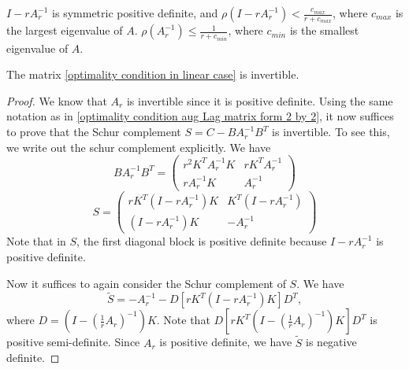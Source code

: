 \begin{itemize}
\begin{lemma}
$I - rA_r^{-1}$ is symmetric positive definite, and $\rho(I - rA_r^{-1}) < \frac{c_{max}}{r + c_{max}}$, where $c_{max}$ is the largest eigenvalue of $A$. $\rho(A_r^{-1}) \leq \frac{1}{r + c_{min}}$, where $c_{min}$ is the smallest eigenvalue of $A$.
\end{lemma}

\begin{theorem}
The matrix \eqref{optimality condition in linear case} is invertible. 
\end{theorem}
\begin{proof}
We know that $A_r$ is invertible since it is positive definite. 
Using the same notation as in \eqref{optimality condition aug Lag matrix form 2 by 2}, it now suffices to prove that the Schur complement $S = C - B A_{r}^{-1} B^T$ is invertible. To see this, we write out the schur complement explicitly.
We have 
\begin{equation}
    B A_r^{-1} B^T = \begin{pmatrix}
    r^2 K^T A_r^{-1} K&  r K^T A_r^{-1}\\
    r A_r^{-1} K & A_r^{-1}
    \end{pmatrix}
\end{equation}
\begin{equation}
    S = \begin{pmatrix}
    r K^T \left(I - r A_{r}^{-1} \right)K  & K^T (I -  r A_{r}^{-1} ) \\
    (I -  r A_{r}^{-1} ) K  & - A_{r}^{-1}
    \end{pmatrix}
\end{equation}
Note that in $S$, the first diagonal block is positive definite because $I - r A_{r}^{-1}$ is positive definite. 

Now it suffices to again consider the Schur complement of $S$. We have 
\begin{equation}
    \tilde{S} = -A_r^{-1} - D \left[ r K^T \left(I -  r A_{r}^{-1} \right)K  \right] D^T  ,
\end{equation}
where $D = (I - (\frac{1}{r} A_r)^{-1}) K$.
Note that $D \left[ r K^T \left(I - (\frac{1}{r} A_{r})^{-1} \right)K  \right] D^T $ is positive semi-definite. Since $A_r$ is positive definite, we have $\tilde{S}$ is negative definite. 
\end{proof}


\end{itemize}
